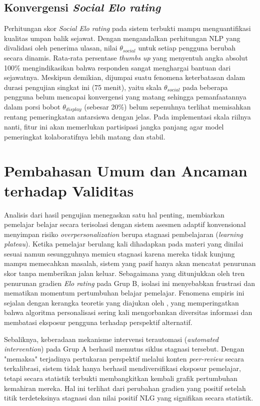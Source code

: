 \subsection{Konvergensi \textit{Social Elo rating}}
Perhitungan skor \textit{Social Elo rating} pada sistem terbukti mampu menguantifikasi kualitas umpan balik sejawat. Dengan mengandalkan perhitungan NLP yang divalidasi oleh penerima ulasan, nilai $\theta_{social}$ untuk setiap pengguna berubah secara dinamis. Rata-rata persentase \textit{thumbs up} yang menyentuh angka absolut 100\% mengindikasikan bahwa responden sangat menghargai bantuan dari sejawatnya. Meskipun demikian, dijumpai suatu fenomena keterbatasan dalam durasi pengujian singkat ini (75 menit), yaitu skala $\theta_{social}$ pada beberapa pengguna belum mencapai konvergensi yang matang sehingga pemanfaatannya dalam porsi bobot $\theta_{display}$ (sebesar 20\%) belum sepenuhnya terlihat memisahkan rentang pemeringkatan antarsiswa dengan jelas. Pada implementasi skala riilnya nanti, fitur ini akan memerlukan partisipasi jangka panjang agar model pemeringkat kolaboratifnya lebih matang dan stabil.

\section{Pembahasan Umum dan Ancaman terhadap Validitas}
\label{sec:pembahasan_umum}

Analisis dari hasil pengujian menegaskan satu hal penting, membiarkan pemelajar belajar secara terisolasi dengan sistem asesmen adaptif konvensional menyimpan risiko \textit{overpersonalization} berupa stagnasi pembelajaran (\textit{learning plateau}). Ketika pemelajar berulang kali dihadapkan pada materi yang dinilai sesuai namun sesungguhnya memicu stagnasi karena mereka tidak kunjung mampu memecahkan masalah, sistem yang pasif hanya akan mencatat penurunan skor tanpa memberikan jalan keluar. Sebagaimana yang ditunjukkan oleh tren penurunan gradien \textit{Elo rating} pada Grup B, isolasi ini menyebabkan frustrasi dan mematikan momentum pertumbuhan belajar pemelajar. Fenomena empiris ini sejalan dengan kerangka teoretis yang diajukan oleh \textcite{Bahg2025}, yang memperingatkan bahwa algoritma personalisasi sering kali mengorbankan diversitas informasi dan membatasi eksposur pengguna terhadap perspektif alternatif.

Sebaliknya, keberadaan mekanisme intervensi terautomasi (\textit{automated intervention}) pada Grup A berhasil memutus siklus stagnasi tersebut. Dengan "memaksa" terjadinya pertukaran perspektif melalui konten \textit{peer-review} secara terkalibrasi, sistem tidak hanya berhasil mendiversifikasi eksposur pemelajar, tetapi secara statistik terbukti membangkitkan kembali grafik pertumbuhan kemahiran mereka. Hal ini terlihat dari perubahan gradien yang positif setelah titik terdeteksinya stagnasi dan nilai positif NLG yang signifikan secara statistik.

